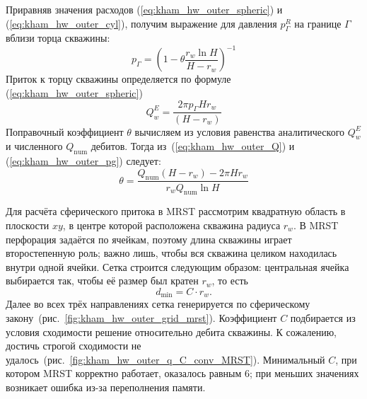\documentclass{article}
\begin{document}
Приравняв значения расходов (\ref{eq:kham_hw_outer_spheric}) и (\ref{eq:kham_hw_outer_cyl}), получим выражение для давления $p^R_{\Gamma}$ на границе $\Gamma$ вблизи торца скважины:
\begin{equation}
\displaystyle
p_{\Gamma} = \left(1- \theta \dfrac{r_w \ln{H}}{H - r_w}\right)^{-1}
\label{eq:kham_hw_outer_pg}
\end{equation}
Приток к торцу скважины определяется по формуле (\ref{eq:kham_hw_outer_spheric})
\begin{equation}
\displaystyle
Q_w^E = \dfrac{2\pi p_{\Gamma} H r_w}{\left(H - r_w\right)}
\label{eq:kham_hw_outer_Q}
\end{equation}
Поправочный коэффициент $\theta$ вычисляем из условия равенства аналитического $Q_w^E$ и численного $Q_{\text{num}}$ дебитов.
Тогда из~(\ref{eq:kham_hw_outer_Q}) и (\ref{eq:kham_hw_outer_pg}) следует:
\begin{equation}
\displaystyle
\theta = \dfrac{Q_{\text{num}} \left(H - r_w \right) - 2 \pi H r_w}{r_w Q_{\text{num}} \ln{H}}
\label{eq:kham_hw_outer_theta}
\end{equation}

Для расчёта сферического притока в MRST рассмотрим квадратную область в
плоскости $xy$, в центре которой расположена скважина радиуса $r_w$. В MRST перфорация задаётся по ячейкам, поэтому длина скважины играет второстепенную роль;
важно лишь, чтобы вся скважина целиком находилась внутри одной ячейки. Сетка строится следующим образом: центральная ячейка выбирается так, чтобы её размер
был кратен $r_w$, то есть
\begin{equation*}
\displaystyle
d_{\text{min}} = C \cdot r_w.
\end{equation*}
Далее во всех трёх направлениях сетка генерируется по сферическому закону~(рис.~\ref{fig:kham_hw_outer_grid_mrst}). Коэффициент $C$ подбирается из условия сходимости решение относительно дебита скважины. К сожалению, достичь строгой сходимости не удалось~(рис.~\ref{fig:kham_hw_outer_q_C_conv_MRST}). Минимальный $C$, при котором MRST корректно работает, оказалось равным 6; при меньших значениях возникает ошибка из-за переполнения памяти.
\end{document}
